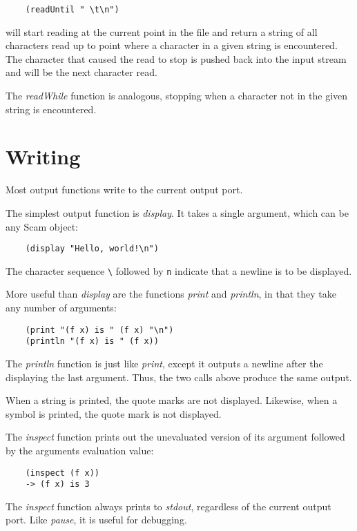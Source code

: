 \begin{verbatim}
    (readUntil " \t\n")
\end{verbatim}

will start reading at the current point in the file
and return a string of all characters read up to point
where a character in a given string is encountered.
The character that caused the read to stop is pushed
back into the input stream and will be the next character
read.

The {\it readWhile} function is analogous, stopping when
a character not in the given string is encountered.

\section{Writing}

Most output functions write to the current output port.

The simplest output function is {\it display}. It takes a single
argument, which can be any Scam object:

\begin{verbatim}
    (display "Hello, world!\n")
\end{verbatim}

The character sequence \verb!\! followed by
\verb!n! indicate that
a newline is to be displayed.

More useful than {\it display} are the functions {\it print} and
{\it println}, in that they take any number of arguments:

\begin{verbatim}
    (print "(f x) is " (f x) "\n")
    (println "(f x) is " (f x))
\end{verbatim}

The {\it println} function is just like {\it print}, except it
outputs a newline after the displaying the last argument.
Thus, the two calls above produce the same output.

When a string is printed, the quote marks are not displayed.
Likewise, when a symbol is printed, the quote mark is not displayed.

The {\it inspect} function 
prints out the unevaluated
version of its argument followed by the arguments evaluation value:

\begin{verbatim}
    (inspect (f x))
    -> (f x) is 3
\end{verbatim}

The {\it inspect} function always prints to {\it stdout},
regardless of the current output port. Like {\it pause}, it is
useful for debugging.

